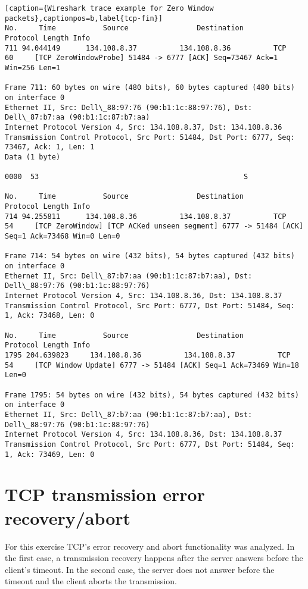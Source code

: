 \begin{lstlisting}[caption={Wireshark trace example for Zero Window packets},captionpos=b,label{tcp-fin}]
No.     Time           Source                Destination           Protocol Length Info
711 94.044149      134.108.8.37          134.108.8.36          TCP      60     [TCP ZeroWindowProbe] 51484 -> 6777 [ACK] Seq=73467 Ack=1 Win=256 Len=1

Frame 711: 60 bytes on wire (480 bits), 60 bytes captured (480 bits) on interface 0
Ethernet II, Src: Dell\_88:97:76 (90:b1:1c:88:97:76), Dst: Dell\_87:b7:aa (90:b1:1c:87:b7:aa)
Internet Protocol Version 4, Src: 134.108.8.37, Dst: 134.108.8.36
Transmission Control Protocol, Src Port: 51484, Dst Port: 6777, Seq: 73467, Ack: 1, Len: 1
Data (1 byte)

0000  53                                                S

No.     Time           Source                Destination           Protocol Length Info
714 94.255811      134.108.8.36          134.108.8.37          TCP      54     [TCP ZeroWindow] [TCP ACKed unseen segment] 6777 -> 51484 [ACK] Seq=1 Ack=73468 Win=0 Len=0

Frame 714: 54 bytes on wire (432 bits), 54 bytes captured (432 bits) on interface 0
Ethernet II, Src: Dell\_87:b7:aa (90:b1:1c:87:b7:aa), Dst: Dell\_88:97:76 (90:b1:1c:88:97:76)
Internet Protocol Version 4, Src: 134.108.8.36, Dst: 134.108.8.37
Transmission Control Protocol, Src Port: 6777, Dst Port: 51484, Seq: 1, Ack: 73468, Len: 0

No.     Time           Source                Destination           Protocol Length Info
1795 204.639823     134.108.8.36          134.108.8.37          TCP      54     [TCP Window Update] 6777 -> 51484 [ACK] Seq=1 Ack=73469 Win=18 Len=0

Frame 1795: 54 bytes on wire (432 bits), 54 bytes captured (432 bits) on interface 0
Ethernet II, Src: Dell\_87:b7:aa (90:b1:1c:87:b7:aa), Dst: Dell\_88:97:76 (90:b1:1c:88:97:76)
Internet Protocol Version 4, Src: 134.108.8.36, Dst: 134.108.8.37
Transmission Control Protocol, Src Port: 6777, Dst Port: 51484, Seq: 1, Ack: 73469, Len: 0

\end{lstlisting}

\section{TCP transmission error recovery/abort}
For this exercise TCP's error recovery and abort functionality was analyzed. In the first case, a transmission recovery happens after the server answers before the client's timeout. In the second case, the server does not answer before the timeout and the client aborts the transmission.
